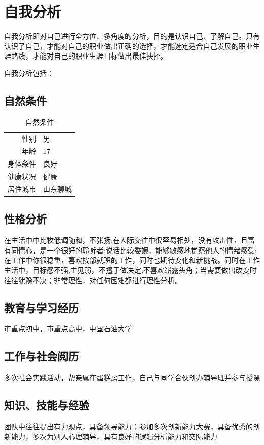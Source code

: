 \documentclass{article}
\begin{document}
\thispagestyle{empty}
\newpage
\setcounter{page}{1}
\section{自我分析}
	自我分析即对自己进行全方位、多角度的分析，目的是认识自己、了解自己。只有认识了自己，才能对自己的职业做出正确的选择，才能选定适合自己发展的职业生涯路线，才能对自己的职业生涯目标做出最佳抉择。\par
	自我分析包括：\par
\subsection{自然条件}
\begin{table}[h]
	\centering
	\caption{自然条件}
	\begin{tabular}{rl}
		\hline
		性别 & 男 \\
		年龄 & 17 \\ 
		身体条件 & 良好 \\
		健康状况 & 健康\\
		居住城市 & 山东聊城\\
		\hline
	\end{tabular}
	\label{table1}
\end{table}
\subsection{性格分析}
在生活中中比牧低调随和，不张扬;在人际交往中很容易相处，没有攻击性，且富有同情心，是一个很好的聆听者;说话比较委婉，能够敏感地觉察他人的情绪感受;在工作中你很稳重，喜欢按部就班的工作，同时也期待变化和新挑战。同时在工作生活中，目标感不强,主见弱，不擅于做决定;不喜欢崭露头角；当需要做出改变时往往犹豫不决；非常理性，对任何困难都进行理性分析。
\par
\subsection{教育与学习经历}
市重点初中，市重点高中，中国石油大学
\par
\subsection{工作与社会阅历}
多次社会实践活动，帮亲属在蛋糕房工作，自己与同学合伙创办辅导班并参与授课
\par
\subsection{知识、技能与经验}
团队中往往提出有力观点，具备领导能力；参加多次创新能力大赛，具备优秀的创新能力，多次为别人心理辅导，具有良好的逻辑分析能力和交际能力
\par
\end{document}
